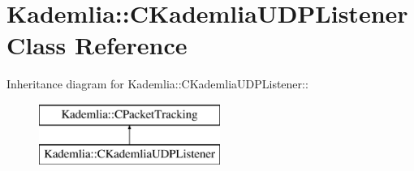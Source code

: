 \section{Kademlia::CKademliaUDPListener Class Reference}
\label{classKademlia_1_1CKademliaUDPListener}
Inheritance diagram for Kademlia::CKademliaUDPListener::\begin{figure}[H]
\begin{center}
\leavevmode
\includegraphics[height=2cm]{classKademlia_1_1CKademliaUDPListener}
\end{center}
\end{figure}
